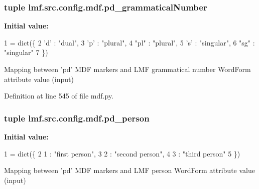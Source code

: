 \hypertarget{namespacelmf_1_1src_1_1config_1_1mdf_a64be26974728c369cd72ef80bd297154}{
\subsubsection[{pd\+\_\+grammatical\+Number}]{\setlength{\rightskip}{0pt plus 5cm}tuple lmf.\+src.\+config.\+mdf.\+pd\+\_\+grammatical\+Number}}\label{namespacelmf_1_1src_1_1config_1_1mdf_a64be26974728c369cd72ef80bd297154}
{\bfseries Initial value\+:}
\begin{DoxyCode}
1 = dict(\{
2     \textcolor{stringliteral}{'d'}     : \textcolor{stringliteral}{"dual"},
3     \textcolor{stringliteral}{'p'}     : \textcolor{stringliteral}{"plural"},
4     \textcolor{stringliteral}{"pl"}    : \textcolor{stringliteral}{"plural"},
5     \textcolor{stringliteral}{'s'}     : \textcolor{stringliteral}{"singular"},
6     \textcolor{stringliteral}{"sg"}    : \textcolor{stringliteral}{"singular"}
7 \})
\end{DoxyCode}


Mapping between 'pd' M\+D\+F markers and L\+M\+F grammatical number Word\+Form attribute value (input) 



Definition at line 545 of file mdf.\+py.

\hypertarget{namespacelmf_1_1src_1_1config_1_1mdf_ab58fb9b58bc32ac36efe9b26e4ea3ca2}{
\subsubsection[{pd\+\_\+person}]{\setlength{\rightskip}{0pt plus 5cm}tuple lmf.\+src.\+config.\+mdf.\+pd\+\_\+person}}\label{namespacelmf_1_1src_1_1config_1_1mdf_ab58fb9b58bc32ac36efe9b26e4ea3ca2}
{\bfseries Initial value\+:}
\begin{DoxyCode}
1 = dict(\{
2     1 : \textcolor{stringliteral}{"first person"},
3     2 : \textcolor{stringliteral}{"second person"},
4     3 : \textcolor{stringliteral}{"third person"}
5 \})
\end{DoxyCode}


Mapping between 'pd' M\+D\+F markers and L\+M\+F person Word\+Form attribute value (input) 



